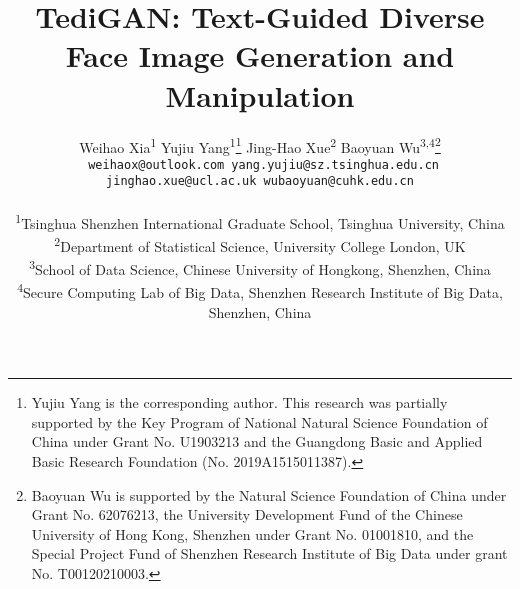 \documentclass[final]{cvpr}
\newcommand*{\affaddr}[1]{#1}
\newcommand*{\affmark}[1][*]{\textsuperscript{#1}}
\begin{document}
\title{TediGAN: Text-Guided Diverse Face Image Generation and Manipulation}

\author{\hspace{-20pt}
Weihao Xia\affmark[1]
\qquad
Yujiu Yang\affmark[1]\thanks{Yujiu Yang is the corresponding author. This research was partially supported by the Key Program of National Natural Science Foundation of China under Grant No. U1903213 and the Guangdong Basic and Applied Basic Research Foundation (No. 2019A1515011387).}
\qquad
Jing-Hao Xue\affmark[2]
\qquad
Baoyuan Wu\affmark[3,4]\thanks{Baoyuan Wu is supported by the Natural Science Foundation of China under Grant No. 62076213, the University Development Fund of the Chinese University of Hong Kong, Shenzhen under Grant No. 01001810, and the Special Project Fund of Shenzhen Research Institute of Big Data under grant No. T00120210003.}
\\
{\tt\small \hspace{-10pt}
weihaox@outlook.com \hspace{0.5pt}
yang.yujiu@sz.tsinghua.edu.cn \hspace{0.5pt}
jinghao.xue@ucl.ac.uk \hspace{0.5pt}
wubaoyuan@cuhk.edu.cn}

\\
\affaddr{
\affmark[1]Tsinghua Shenzhen International Graduate School, Tsinghua University, China\\
\affmark[2]Department of Statistical Science, University College London, UK\\
\affmark[3]School of Data Science, Chinese University of Hongkong, Shenzhen, China\\
\affmark[4]Secure Computing Lab of Big Data, Shenzhen Research Institute of Big Data, Shenzhen, China}
}

\maketitle
\thispagestyle{empty}
\end{document}
